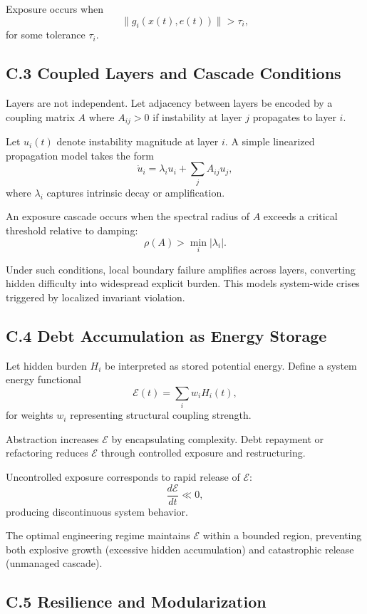 \documentclass[11pt]{article}
\begin{document}
Exposure occurs when
\[
\| g_i(x(t), e(t)) \| > \tau_i,
\]
for some tolerance $\tau_i$.

\subsection{C.3 Coupled Layers and Cascade Conditions}

Layers are not independent. Let adjacency between layers be encoded by a coupling matrix $A$ where $A_{ij} > 0$ if instability at layer $j$ propagates to layer $i$.

Let $u_i(t)$ denote instability magnitude at layer $i$. A simple linearized propagation model takes the form
\[
\dot{u}_i = \lambda_i u_i + \sum_{j} A_{ij} u_j,
\]
where $\lambda_i$ captures intrinsic decay or amplification.

An exposure cascade occurs when the spectral radius of $A$ exceeds a critical threshold relative to damping:
\[
\rho(A) > \min_i |\lambda_i|.
\]

Under such conditions, local boundary failure amplifies across layers, converting hidden difficulty into widespread explicit burden. This models system-wide crises triggered by localized invariant violation.

\subsection{C.4 Debt Accumulation as Energy Storage}

Let hidden burden $H_i$ be interpreted as stored potential energy. Define a system energy functional
\[
\mathcal{E}(t) = \sum_i w_i H_i(t),
\]
for weights $w_i$ representing structural coupling strength.

Abstraction increases $\mathcal{E}$ by encapsulating complexity. Debt repayment or refactoring reduces $\mathcal{E}$ through controlled exposure and restructuring.

Uncontrolled exposure corresponds to rapid release of $\mathcal{E}$:
\[
\frac{d\mathcal{E}}{dt} \ll 0,
\]
producing discontinuous system behavior.

The optimal engineering regime maintains $\mathcal{E}$ within a bounded region, preventing both explosive growth (excessive hidden accumulation) and catastrophic release (unmanaged cascade).

\subsection{C.5 Resilience and Modularization}
\end{document}
